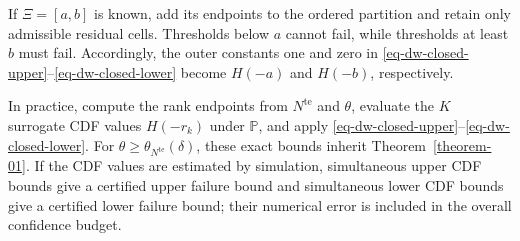 \begin{remark}
  \label{rem-interval-support}
  If $\Xi=[a,b]$ is known, add its endpoints to the ordered partition and retain only admissible residual cells. Thresholds below $a$ cannot fail, while thresholds at least $b$ must fail. Accordingly, the outer constants one and zero in \eqref{eq-dw-closed-upper}--\eqref{eq-dw-closed-lower} become $H(-a)$ and $H(-b)$, respectively.
\end{remark}

In practice, compute the rank endpoints from $N^{\mathrm{te}}$ and $\theta$, evaluate the $K$ surrogate CDF values $H(-r_k)$ under $\mathbb P$, and apply \eqref{eq-dw-closed-upper}--\eqref{eq-dw-closed-lower}. For $\theta\ge\theta_{N^{\mathrm{te}}}(\delta)$, these exact bounds inherit Theorem~\ref{theorem-01}. If the CDF values are estimated by simulation, simultaneous upper CDF bounds give a certified upper failure bound and simultaneous lower CDF bounds give a certified lower failure bound; their numerical error is included in the overall confidence budget.

